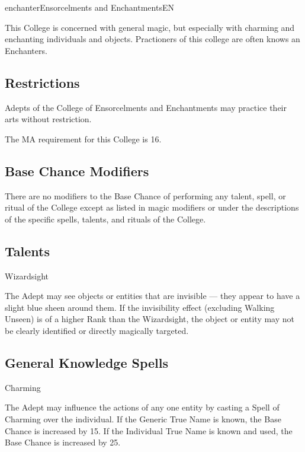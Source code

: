 \begin{college}[1.1]{enchanter}{Ensorcelments and Enchantments}{EN}

This College is concerned with general magic, but especially with
charming and enchanting individuals and objects.  Practioners of
this college are often knows an Enchanters.

\subsection{Restrictions}

Adepts of the College of Ensorcelments and Enchantments may practice
their arts without restriction.

The MA requirement for this College is 16.

\subsection{Base Chance Modifiers}

There are no modifiers to the Base Chance of performing any talent,
spell, or ritual of the College except as listed in magic modifiers or
under the descriptions of the specific spells, talents, and rituals of
the College.

\subsection{Talents}

\begin{talent}[T-1]{Wizardsight}

\begin{effects}
The Adept may see objects or entities that are invisible --- they
appear to have a slight blue sheen around them. If the invisibility
effect (excluding Walking Unseen) is of a higher Rank than the
Wizardsight, the object or entity may not be clearly identified or
directly magically targeted.
\end{effects}
\end{talent}

\subsection{General Knowledge Spells}

\begin{spell}[G-1]{Charming}

\begin{effects}
The Adept may influence the actions of any one entity by casting a
Spell of Charming over the individual. If the Generic True Name is
known, the Base Chance is increased by 15. If the Individual True Name
is known and used, the Base Chance is increased by 25.


\end{effects}
\end{spell}
\end{college}
